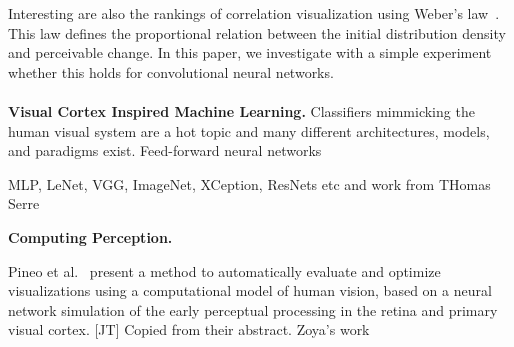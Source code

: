 Interesting are also the rankings of correlation visualization using Weber's law~\cite{harrison2014_webers_law_rank}. This law defines the proportional relation between the initial distribution density and perceivable change. In this paper, we investigate with a simple experiment whether this holds for convolutional neural networks. 
\\~\\
\textbf{Visual Cortex Inspired Machine Learning.} Classifiers mimmicking the human visual system are a hot topic and many different architectures, models, and paradigms exist. Feed-forward neural networks 

MLP, LeNet, VGG, ImageNet, XCeption, ResNets etc and work from THomas Serre
%
%
%
%

\textbf{Computing Perception.}

Pineo et al.~\cite{Pineo2012_computational_perception} present a method to automatically evaluate and optimize visualizations using a computational model of human vision, based on a neural network simulation of the early perceptual processing in the retina and primary visual cortex. [JT] Copied from their abstract.
Zoya's work

